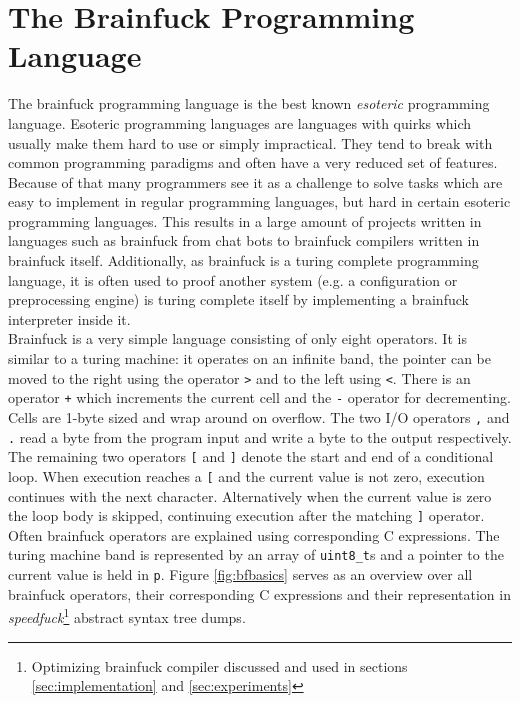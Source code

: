 \documentclass[11pt, a4paper]{article}
\begin{document}
\section{The Brainfuck Programming Language}
The brainfuck programming language is the best known \textit{esoteric} programming language. Esoteric programming languages are languages with quirks which usually make them hard to use or simply impractical. They tend to break with common programming paradigms and often have a very reduced set of features. Because of that many programmers see it as a challenge to solve tasks which are easy to implement in regular programming languages, but hard in certain esoteric programming languages. This results in a large amount of projects written in languages such as brainfuck from chat bots\cite{bf-chatbot} to brainfuck compilers written in brainfuck itself\cite{bf-compiler}. Additionally, as brainfuck is a turing complete programming language, it is often used to proof another system (e.g. a configuration or preprocessing engine) is turing complete itself by implementing a brainfuck interpreter inside it. \\
Brainfuck is a very simple language consisting of only eight operators. It is similar to a turing machine\cite{turing}: it operates on an infinite band, the pointer can be moved to the right using the operator \verb'>' and to the left using \verb'<'. There is an operator \verb'+' which increments the current cell and the \verb'-' operator for decrementing. Cells are 1-byte sized and wrap around on overflow. The two I/O operators \verb',' and \verb'.' read a byte from the program input and write a byte to the output respectively. The remaining two operators \verb'[' and \verb']' denote the start and end of a conditional loop. When execution reaches a \verb'[' and the current value is not zero, execution continues with the next character. Alternatively when the current value is zero the loop body is skipped, continuing execution after the matching \verb']' operator. \\
Often brainfuck operators are explained using corresponding C expressions. The turing machine band is represented by an array of \verb'uint8_t's and a pointer to the current value is held in \verb'p'. Figure \ref{fig:bfbasics} serves as an overview over all brainfuck operators, their corresponding C expressions and their representation in \textit{speedfuck}\footnote{Optimizing brainfuck compiler\cite{speedfuck} discussed and used in sections \ref{sec:implementation} and \ref{sec:experiments}} abstract syntax tree dumps\cite{speedfuck}.
\end{document}
